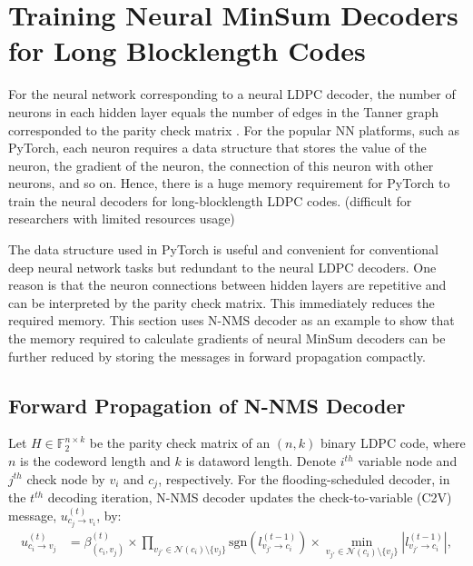 \documentclass [PhD] {uclathes}
\begin{document}
\section{Training Neural MinSum Decoders for Long Blocklength Codes}\label{sec: effi_NNMS}
For the neural network corresponding to a neural LDPC decoder, the number of neurons in each hidden layer equals the number of edges in the Tanner graph corresponded to the parity check matrix  \cite{Nachmani2016-bs}. For the popular NN platforms, such as PyTorch, each neuron requires a data structure that stores the value of the neuron, the gradient of the neuron, the connection of this neuron with other neurons, and so on. Hence, there is a huge memory requirement for PyTorch to train the neural decoders for long-blocklength LDPC codes. (difficult for researchers with limited resources usage)


The data structure used in PyTorch is useful and convenient for conventional deep neural network tasks but redundant to the neural LDPC decoders. One reason is that the neuron connections between hidden layers are repetitive and can be interpreted by the parity check matrix.
This immediately reduces the required memory.  
This section uses N-NMS decoder as an example to show that the memory required to calculate gradients of neural MinSum decoders can be further reduced by storing the messages in forward propagation compactly.

\subsection{Forward Propagation of N-NMS Decoder}
Let $H\in\mathbb{F}_2^{n\times k}$ be the parity check matrix of an $(n,k)$ binary LDPC code, where $n$ is the codeword length and $k$ is dataword length. Denote $i^{th}$ variable node and $j^{th}$ check node by $v_i$ and $c_j$, respectively. 
For the flooding-scheduled decoder, in the $t^{th}$ decoding iteration, N-NMS decoder updates the check-to-variable (C2V) message, $u^{(t)}_{c_j \rightarrow v_i}$, by: 
\begin{align}
     u^{(t)}_{c_i\rightarrow v_j} &= \beta^{(t)}_{(c_i,v_j)} \times  \prod_{v_{j'}\in \mathcal{N}(c_i)\setminus\{v_j\}} \text{sgn}\left(l^{(t-1)}_{v_{j'}\rightarrow c_{i}}\right)  \times  \min_{v_{j'}\in \mathcal{N}(c_i)\setminus\{v_j\}} \left|l^{(t-1)}_{v_{j'}\rightarrow c_{i}}\right|,
\end{align}
\end{document}
